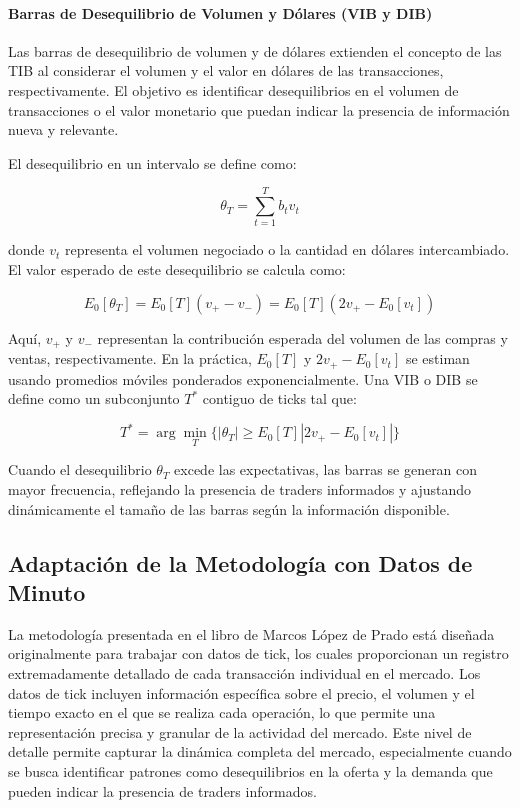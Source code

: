 \documentclass[a4paper,12pt]{report}
\begin{document}
\paragraph{Barras de Desequilibrio de Volumen y Dólares (VIB y DIB)}

Las barras de desequilibrio de volumen y de dólares extienden el concepto de las TIB al considerar el volumen 
y el valor en dólares de las transacciones, respectivamente. El objetivo es identificar desequilibrios en el volumen de 
transacciones o el valor monetario que puedan indicar la presencia de información nueva y relevante.

El desequilibrio en un intervalo se define como:

\begin{equation}
\theta_T = \sum_{t=1}^{T} b_t v_t
\end{equation}

donde \(v_t\) representa el volumen negociado o la cantidad en dólares intercambiado. El valor esperado de este desequilibrio 
se calcula como:

\begin{equation}
E_0[\theta_T] = E_0[T](v_+ - v_-) = E_0[T](2v_+ - E_0[v_t])
\end{equation}

Aquí, \(v_+\) y \(v_-\) representan la contribución esperada del volumen de las compras y ventas, respectivamente. En la 
práctica, \(E_0[T]\) y \(2v_+ - E_0[v_t]\) se estiman usando promedios móviles ponderados exponencialmente. Una VIB o DIB 
se define como un subconjunto \(T^*\) contiguo de ticks tal que:

\begin{equation}
T^* = \arg \min_{T} \{|\theta_T| \geq E_0[T]|2v_+ - E_0[v_t]| \}
\end{equation}

Cuando el desequilibrio \(\theta_T\) excede las expectativas, las barras se generan con mayor frecuencia, reflejando la 
presencia de traders informados y ajustando dinámicamente el tamaño de las barras según la información disponible.

\subsection{Adaptación de la Metodología con Datos de Minuto}

La metodología presentada en el libro de Marcos López de Prado está diseñada originalmente para trabajar con datos de tick, 
los cuales proporcionan un registro extremadamente detallado de cada transacción individual en el mercado. Los datos de tick 
incluyen información específica sobre el precio, el volumen y el tiempo exacto en el que se realiza cada operación, lo que 
permite una representación precisa y granular de la actividad del mercado. Este nivel de detalle permite capturar la dinámica 
completa del mercado, especialmente cuando se busca identificar patrones como desequilibrios en la oferta y la demanda que 
pueden indicar la presencia de traders informados.
\end{document}
